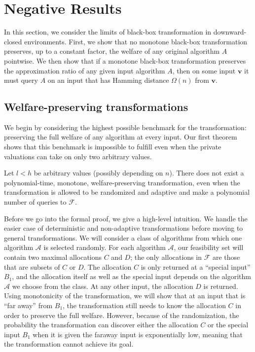 \documentclass[runningheads,a4paper]{llncs}
\begin{document}
\section{Negative Results}
\label{sec:negativeresults}

In this section, we consider the limits of black-box transformation in downward-closed environments. First, we show that no monotone black-box transformation preserves, up to a constant factor, the welfare of any original algorithm $A$ pointwise. We then show that if a monotone black-box transformation preserves the approximation ratio of any given input algorithm $A$, then on some input $\textbf{v}$ it must query $A$ on an input that has Hamming distance $\Omega(n)$ from $\textbf{v}$.

\subsection{Welfare-preserving transformations} 

We begin by considering the highest possible benchmark for the transformation: preserving the full welfare of any algorithm at every input. Our first theorem shows that this benchmark is impossible to fulfill even when the private valuations can take on only two arbitrary values.

\begin{theorem} 
\label{thm:100pointwise}
Let $l<h$ be arbitrary values (possibly depending on $n$). There does not exist a polynomial-time, monotone, welfare-preserving transformation, even when the transformation is allowed to be randomized and adaptive and make a polynomial number of queries to $\mathcal{F}$.
\end{theorem}

Before we go into the formal proof, we give a high-level intuition. We handle the easier case of deterministic and non-adaptive transformations before moving to general transformations. We will consider a class of algorithms from which one algorithm $\mathcal{A}$ is selected randomly. For each algorithm $\mathcal{A}$, our feasibility set will contain two maximal allocations $C$ and $D$; the only allocations in $\mathcal{F}$ are those that are subsets of $C$ or $D$. The allocation $C$ is only returned at a ``special input'' $B_1$, and the allocation itself as well as the special input depends on the algorithm $\mathcal{A}$ we choose from the class. At any other input, the allocation $D$ is returned. Using monotonicity of the transformation, we will show that at an input that is ``far away'' from $B_1$, the transformation still needs to know the allocation $C$ in order to preserve the full welfare. However, because of the randomization, the probability the transformation can discover either the allocation $C$ or the special input $B_1$ when it is given the faraway input is exponentially low, meaning that the transformation cannot achieve its goal.
\end{document}
